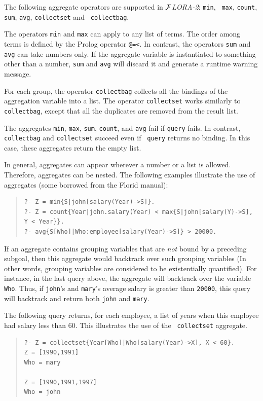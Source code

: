 \documentclass[11pt]{article}
\newcommand{\FLORA}{{\mbox{${\cal F}${\small\it LORA}\rm\emph{-2}}}\xspace}
\newcommand{\FLORID}{{\mbox{\sc Florid}}\xspace}
\begin{document}
%
The following aggregate operators are supported in \FLORA: {\tt min}, {\tt
  max}, {\tt count}, {\tt sum}, {\tt avg}, {\tt collectset} and {\tt
  collectbag}.

The operators {\tt min} and {\tt max} can apply to any list of
terms. The order among terms is defined by the Prolog operator {\tt @=<}.  In
contrast, the operators {\tt sum} and {\tt avg} can take numbers only. If
the aggregate variable is instantiated to something other than a
number, {\tt sum} and {\tt avg} will discard it and generate a runtime
warning message.

For each group, the operator {\tt collectbag} collects all the bindings of
the aggregation variable into a list. The operator {\tt collectset} works
similarly to {\tt collectbag}, except that all the duplicates are removed
from the result list.


The aggregates {\tt min}, {\tt max}, {\tt sum}, {\tt count}, and {\tt avg}
fail if {\tt query} fails.
In contrast, {\tt collectbag} and {\tt collectset} succeed even if {\tt
  query} returns no binding. In this case, these aggregates return the
empty list.

In general, aggregates can appear wherever a number or a list is
allowed. Therefore, aggregates can be nested. The following examples
illustrate the use of aggregates (some borrowed from the \FLORID manual):
\begin{quote}
\begin{verbatim}
?- Z = min{S|john[salary(Year)->S]}.
?- Z = count{Year|john.salary(Year) < max{S|john[salary(Y)->S], Y < Year}}.
?- avg{S[Who]|Who:employee[salary(Year)->S]} > 20000. 
\end{verbatim}
\end{quote}
If an aggregate contains grouping variables that are \emph{not} bound
by a preceding subgoal, then this aggregate would backtrack over such
grouping variables (In other words, grouping variables are considered to be
existentially quantified). For instance, in the last query above, the
aggregate will backtrack over the variable {\tt Who}. Thus, if
{\tt john}'s and {\tt mary}'s average salary is greater than {\tt 20000},
this query will backtrack and return both {\tt john} and {\tt mary}.

The following query returns, for each employee, a list of years when this
employee had salary less than 60. This illustrates the use of the {\tt
  collectset} aggregate.
\begin{quote}
\begin{verbatim}
?- Z = collectset{Year[Who]|Who[salary(Year)->X], X < 60}.
Z = [1990,1991]
Who = mary

Z = [1990,1991,1997]
Who = john
\end{verbatim}
\end{quote}
\end{document}
